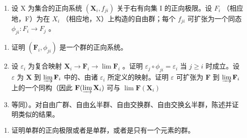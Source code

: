 \BourbakiExercisesSection

\begin{enumerate}
\def\labelenumi{\arabic{enumi}.}
\tightlist
\item
  设 X 为集合的正向系统 \((\mathbf{X}_{i}, f_{ji})\) 关于右有向集 I 的正向极限。设 \(F_{i}\) （相应地，F）为在 \(X_{i}\) （相应地，X）上构造的自由群；每个 \(f_{ji}\) 可扩张为一个同态 \(\phi_{ji}: F_{i} \to F_{j}\) 。
\end{enumerate}

\begin{enumerate}
\def\labelenumi{(\alph{enumi})}
\item
  证明 \((\mathbf{F}_i,\phi_{ji})\) 是一个群的正向系统。
\item
  设 \(\varepsilon_{i}\) 为复合映射 \(\mathbf{X}_{i} \to \mathbf{F}_{i} \to \lim \mathbf{F}_{i}\) 。证明 \(\varepsilon_{j} \circ \phi_{ji} = \varepsilon_{i}\) 当 \(j \geqslant i\) 时成立。设 \(\varepsilon\) 为 \(\mathbf{X}\) 到 \(\varinjlim \mathbf{F}_{i}\) 中的、由诸 \(\varepsilon_{i}\) 所定义的映射。证明 \(\varepsilon\) 可扩张为 \(\mathbf{F}\) 到 \(\varinjlim \mathbf{F}_{i}\) 上的一个同构（因此 \(\mathbf{F}(\varinjlim \mathbf{X}_{i})\) 可与 \(\lim \mathbf{F}(\mathbf{X}_{i})\)
\item
  等同）。对自由广群、自由幺半群、自由交换群、自由交换幺半群，陈述并证明类似的结果。
\end{enumerate}

\begin{enumerate}
\def\labelenumi{\arabic{enumi}.}
\setcounter{enumi}{1}
\tightlist
\item
  证明单群的正向极限或者是单群，或者是只有一个元素的群。
\end{enumerate}


